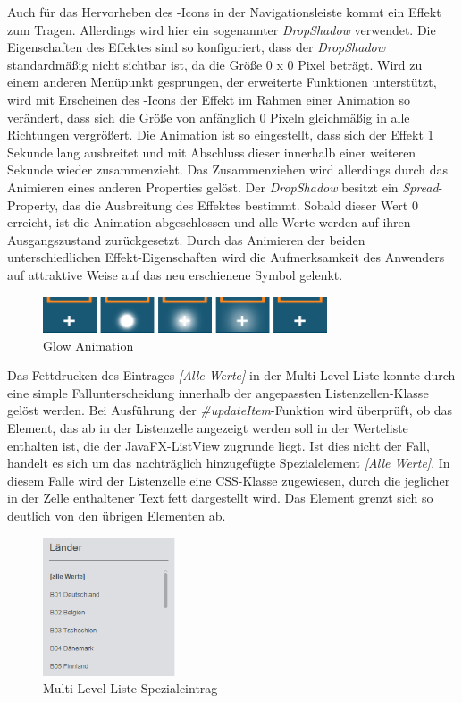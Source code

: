 Auch für das Hervorheben des -Icons in der Navigationsleiste kommt ein Effekt zum Tragen. Allerdings wird hier ein sogenannter \textit{DropShadow} verwendet. Die Eigenschaften des Effektes sind so konfiguriert, dass der \textit{DropShadow} standardmäßig nicht sichtbar ist, da die Größe 0 x 0 Pixel beträgt. Wird zu einem anderen Menüpunkt gesprungen, der erweiterte Funktionen unterstützt, wird mit Erscheinen des -Icons der Effekt im Rahmen einer Animation so verändert, dass sich die Größe von anfänglich 0 Pixeln gleichmäßig in alle Richtungen vergrößert. Die Animation ist so eingestellt, dass sich der Effekt 1 Sekunde lang ausbreitet und mit Abschluss dieser innerhalb einer weiteren Sekunde wieder zusammenzieht. Das Zusammenziehen wird allerdings durch das Animieren eines anderen Properties gelöst. Der \textit{DropShadow} besitzt ein \textit{Spread}- Property, das die Ausbreitung des Effektes bestimmt. Sobald dieser Wert 0 erreicht, ist die Animation abgeschlossen und alle Werte werden auf ihren Ausgangszustand zurückgesetzt. Durch das Animieren der beiden unterschiedlichen Effekt-Eigenschaften wird die Aufmerksamkeit des Anwenders auf attraktive Weise auf das neu erschienene Symbol gelenkt.\par
\begin{figure}[H]
 \centering
 \includegraphics[width=0.75\textwidth]{grafiken/glow_animation.png}
 \caption{Glow Animation}
 \label{fig:glowAnimation}
\end{figure}
Das Fettdrucken des Eintrages \textit{[Alle Werte]} in der Multi-Level-Liste konnte durch eine simple Fallunterscheidung innerhalb der angepassten Listenzellen-Klasse gelöst werden. Bei Ausführung der \textit{\#{}updateItem}-Funktion wird überprüft, ob das Element, das ab in der Listenzelle angezeigt werden soll in der Werteliste enthalten ist, die der JavaFX-ListView zugrunde liegt. Ist dies nicht der Fall, handelt es sich um das nachträglich hinzugefügte Spezialelement \textit{[Alle Werte]}. In diesem Falle wird der Listenzelle eine CSS-Klasse zugewiesen, durch die jeglicher in der Zelle enthaltener Text fett dargestellt wird. Das Element grenzt sich so deutlich von den übrigen Elementen ab.\par
\begin{figure}[H]
 \centering
 \includegraphics[width=0.35\textwidth]{grafiken/mll_Werte.png}
 \caption{Multi-Level-Liste Spezialeintrag}
 \label{fig:mllSpecialValue}
\end{figure}
